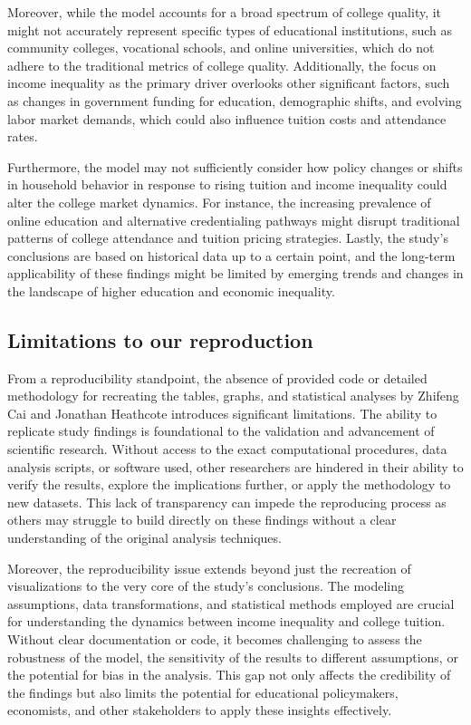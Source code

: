 \documentclass[
  letterpaper,
  DIV=11,
  numbers=noendperiod]{scrartcl}
\begin{document}
Moreover, while the model accounts for a broad spectrum of college
quality, it might not accurately represent specific types of educational
institutions, such as community colleges, vocational schools, and online
universities, which do not adhere to the traditional metrics of college
quality. Additionally, the focus on income inequality as the primary
driver overlooks other significant factors, such as changes in
government funding for education, demographic shifts, and evolving labor
market demands, which could also influence tuition costs and attendance
rates.

Furthermore, the model may not sufficiently consider how policy changes
or shifts in household behavior in response to rising tuition and income
inequality could alter the college market dynamics. For instance, the
increasing prevalence of online education and alternative credentialing
pathways might disrupt traditional patterns of college attendance and
tuition pricing strategies. Lastly, the study's conclusions are based on
historical data up to a certain point, and the long-term applicability
of these findings might be limited by emerging trends and changes in the
landscape of higher education and economic inequality.

\subsection{Limitations to our
reproduction}\label{limitations-to-our-reproduction}

From a reproducibility standpoint, the absence of provided code or
detailed methodology for recreating the tables, graphs, and statistical
analyses by Zhifeng Cai and Jonathan Heathcote introduces significant
limitations. The ability to replicate study findings is foundational to
the validation and advancement of scientific research. Without access to
the exact computational procedures, data analysis scripts, or software
used, other researchers are hindered in their ability to verify the
results, explore the implications further, or apply the methodology to
new datasets. This lack of transparency can impede the reproducing
process as others may struggle to build directly on these findings
without a clear understanding of the original analysis techniques.

Moreover, the reproducibility issue extends beyond just the recreation
of visualizations to the very core of the study's conclusions. The
modeling assumptions, data transformations, and statistical methods
employed are crucial for understanding the dynamics between income
inequality and college tuition. Without clear documentation or code, it
becomes challenging to assess the robustness of the model, the
sensitivity of the results to different assumptions, or the potential
for bias in the analysis. This gap not only affects the credibility of
the findings but also limits the potential for educational policymakers,
economists, and other stakeholders to apply these insights effectively.
\end{document}
